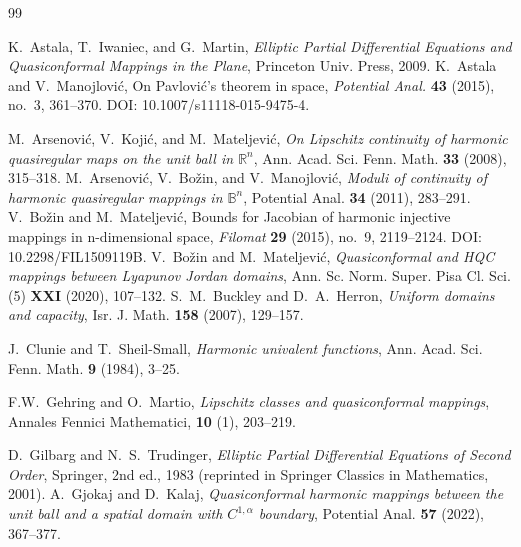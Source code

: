 \documentclass{amsart}
\begin{document}
\begin{thebibliography}{99}

K.~Astala, T.~Iwaniec, and G.~Martin,
\newblock \emph{Elliptic Partial Differential Equations and Quasiconformal Mappings in the Plane},
\newblock Princeton Univ. Press, 2009.
K.~Astala and V.~Manojlovi\'c,
\newblock On Pavlovi\'c's theorem in space,
\newblock \emph{Potential Anal.} \textbf{43} (2015), no.~3, 361--370.
\newblock DOI: 10.1007/s11118-015-9475-4.

M.~Arsenovi\'{c}, V.~Koji\'{c}, and M.~Mateljevi\'{c},
\newblock \emph{On Lipschitz continuity of harmonic quasiregular maps on the unit ball in $\mathbb{R}^n$},
\newblock Ann. Acad. Sci. Fenn. Math. \textbf{33} (2008), 315--318.
M.~Arsenovi\'{c}, V.~Bo\v{z}in, and V.~Manojlovi\'{c},
\newblock \emph{Moduli of continuity of harmonic quasiregular mappings in $\mathbb{B}^n$},
\newblock Potential Anal. \textbf{34} (2011), 283--291.
V.~Bo\v{z}in and M.~Mateljevi\'c,
\newblock Bounds for Jacobian of harmonic injective mappings in n-dimensional space,
\newblock \emph{Filomat} \textbf{29} (2015), no.~9, 2119--2124.
\newblock DOI: 10.2298/FIL1509119B.
V.~Bo\v{z}in and M.~Mateljevi\'{c},
\newblock \emph{Quasiconformal and HQC mappings between Lyapunov Jordan domains},
\newblock Ann. Sc. Norm. Super. Pisa Cl. Sci. (5) \textbf{XXI} (2020), 107--132.
S.~M.~Buckley and D.~A.~Herron,
\newblock \emph{Uniform domains and capacity},
\newblock Isr. J. Math. \textbf{158} (2007), 129–157.

J.~Clunie and T.~Sheil-Small,
\newblock \emph{Harmonic univalent functions},
\newblock Ann. Acad. Sci. Fenn. Math. \textbf{9} (1984), 3--25.

F.W.~Gehring and O.~Martio,
\newblock \emph{Lipschitz classes and quasiconformal mappings},
\newblock Annales Fennici Mathematici, \textbf{10} (1), 203--219.

D.~Gilbarg and N.~S.~Trudinger,
\newblock \emph{Elliptic Partial Differential Equations of Second Order},
\newblock Springer, 2nd ed., 1983
(reprinted in Springer Classics in Mathematics, 2001).
A.~Gjokaj and D.~Kalaj,
\newblock \emph{Quasiconformal harmonic mappings between the unit ball and a spatial domain with $C^{1,\alpha}$ boundary},
\newblock Potential Anal. \textbf{57} (2022), 367--377.


\end{thebibliography}
\end{document}
